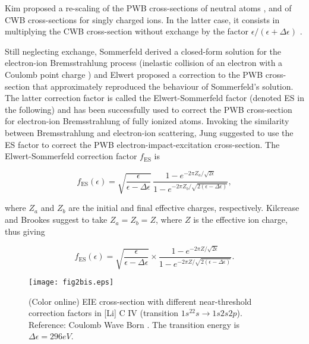 \documentclass[a4paper,10pt]{article}
\begin{document}
Kim proposed a re-scaling of the PWB cross-sections of neutral atoms \cite{KIM02a}, and of CWB cross-sections for singly charged ions. In the latter case, it consists in multiplying the CWB cross-section without exchange by the factor $\epsilon/(\epsilon+\Delta \epsilon)$ \cite{KIM02b}.

Still neglecting exchange, Sommerfeld derived a closed-form solution for the electron-ion Bremsstrahlung process (inelastic collision of an electron with a Coulomb point charge \cite{SOMMERFELD53,BIEDENHARN56,BETHE57}) and Elwert \cite{BETHE57} proposed a correction to the PWB cross-section  that approximately reproduced the behaviour of Sommerfeld's solution. The latter correction factor is called the Elwert-Sommerfeld factor (denoted ES in the following) and has been successfully used to correct the PWB cross-section for electron-ion Bremsstrahlung of fully ionized atoms. Invoking the similarity between Bremsstrahlung and electron-ion scattering, Jung \cite{JUNG92} suggested to use the ES factor to correct the PWB electron-impact-excitation cross-section. The Elwert-Sommerfeld correction factor $f_{\mathrm{ES}}$ is

\begin{equation*}
f_{\mathrm{ES}}(\epsilon)=\sqrt{\frac{\epsilon}{\epsilon-\Delta \epsilon}}\,\frac{1-e^{-2\pi Z_a/\sqrt{2\epsilon}}}{1-e^{-2\pi Z_b/\sqrt{2(\epsilon-\Delta \epsilon)}}},
\end{equation*}

\noindent where $Z_a$ and $Z_b$ are the initial and final effective charges, respectively. Kilcrease and Brookes \cite{KILCREASE13} suggest to take $Z_a=Z_b=Z$, where $Z$ is the effective ion charge, thus giving

\begin{equation*}
f_{\mathrm{ES}}(\epsilon)=\sqrt{\frac{\epsilon}{\epsilon-\Delta \epsilon}}\times\frac{1-e^{-2\pi Z/\sqrt{2\epsilon}}}{1-e^{-2\pi Z/\sqrt{2(\epsilon-\Delta \epsilon)}}}.
\end{equation*}

\begin{figure*}
\vspace{1cm}
\begin{center}
\texttt{[image: fig2bis.eps]}
\end{center}
\caption{(Color online) EIE cross-section with different near-threshold correction factors in [Li] C IV (transition $1s^22s\rightarrow 1s2s2p$). Reference: Coulomb Wave Born \cite{SEATON62}. The transition energy is $\Delta\epsilon=296 eV$.}\label{fig2bis}
\vspace{1cm}
\end{figure*}
\end{document}
